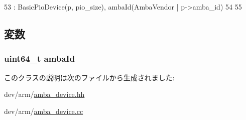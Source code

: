 \begin{DoxyCode}
53     : BasicPioDevice(p, pio_size), ambaId(AmbaVendor | p->amba_id)
54 {
55 }
\end{DoxyCode}


\subsection{変数}
\hypertarget{classAmbaPioDevice_a3201bf99dce0ba0bb6a5fd367f3dd76e}{
\subsubsection[{ambaId}]{\setlength{\rightskip}{0pt plus 5cm}uint64\_\-t {\bf ambaId}}}
\label{classAmbaPioDevice_a3201bf99dce0ba0bb6a5fd367f3dd76e}


このクラスの説明は次のファイルから生成されました:\begin{DoxyCompactItemize}
\item 
dev/arm/\hyperlink{amba__device_8hh}{amba\_\-device.hh}\item 
dev/arm/\hyperlink{amba__device_8cc}{amba\_\-device.cc}\end{DoxyCompactItemize}
